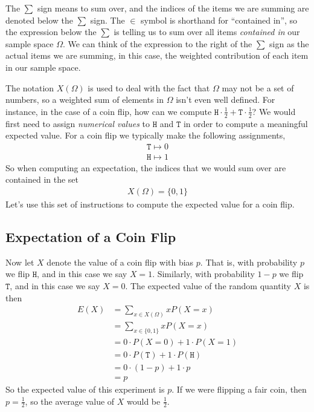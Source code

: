 \documentclass{tufte-book}
\newcommand\hd{\texttt{H}}
\newcommand\tl{\texttt{T}}
\theoremstyle{definition}
\numberwithin{theorem}{section}
\numberwithin{definition}{section}
\numberwithin{lemma}{section}
\numberwithin{corollary}{section}
\numberwithin{proposition}{section}
\numberwithin{remark}{section}
\numberwithin{claim}{section}
\numberwithin{observation}{section}
\numberwithin{fact}{section}
\numberwithin{assumption}{section}
\numberwithin{example}{section}
\numberwithin{exercise}{section}
\begin{document}
The $\sum$ sign means to sum over, and the indices of the items we are summing are denoted below the $\sum$ sign. The $\in$ symbol is shorthand for ``contained in'', so the expression below the $\sum$ is telling us to sum over all items \textit{contained in} our sample space $\Omega$. We can think of the expression to the right of the $\sum$ sign as the actual items we are summing, in this case, the weighted contribution of each item in our sample space.

The notation $X(\Omega)$ is used to deal with the fact that $\Omega$ may not be a set of numbers, so a weighted sum of elements in $\Omega$ isn't even well defined. For instance, in the case of a coin flip, how can we compute $\hd \cdot \frac{1}{2} + \tl \cdot \frac{1}{2}$? We would first need to assign \textit{numerical values} to $\hd$ and $\tl$ in order to compute a meaningful expected value. For a coin flip we typically make the following assignments,
\begin{align*}
\tl \mapsto 0 \\
\hd \mapsto 1 
\end{align*}
So when computing an expectation, the indices that we would sum over are contained in the set
\begin{align*}
X(\Omega) = \{0,1\}
\end{align*}
Let's use this set of instructions to compute the expected value for a coin flip.

\subsection{Expectation of a Coin Flip}
Now let $X$ denote the value of a coin flip with bias $p$. That is, with probability $p$ we flip $\hd$, and in this case we say $X = 1$. Similarly, with probability $1-p$ we flip $\tl$, and in this case we say $X = 0$. The expected value of the random quantity $X$ is then
\begin{align*}
E(X) &= \sum_{x \in X(\Omega)} x P(X = x) \\
&= \sum_{x \in \{0,1\}} x P(X = x) \\
&= 0 \cdot P(X = 0) + 1 \cdot P(X = 1) \\
&= 0 \cdot P(\tl) + 1 \cdot P(\hd) \\
&= 0 \cdot (1-p) + 1 \cdot p \\
&= p
\end{align*}
So the expected value of this experiment is $p$. If we were flipping a fair coin, then $p = \frac{1}{2}$, so the average value of $X$ would be $\frac{1}{2}$.
\end{document}
